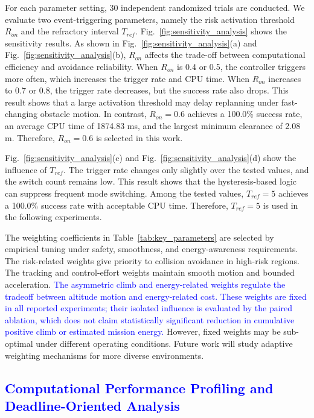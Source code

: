 \documentclass[lettersize,journal]{IEEEtran}
\begin{document}
For each parameter setting, 30 independent randomized trials are conducted. We evaluate two event-triggering parameters, namely the risk activation threshold $R_{on}$ and the refractory interval $T_{ref}$. Fig.~\ref{fig:sensitivity_analysis} shows the sensitivity results. As shown in Fig.~\ref{fig:sensitivity_analysis}(a) and Fig.~\ref{fig:sensitivity_analysis}(b), $R_{on}$ affects the trade-off between computational efficiency and avoidance reliability. When $R_{on}$ is 0.4 or 0.5, the controller triggers more often, which increases the trigger rate and CPU time. When $R_{on}$ increases to 0.7 or 0.8, the trigger rate decreases, but the success rate also drops. This result shows that a large activation threshold may delay replanning under fast-changing obstacle motion. In contrast, $R_{on}=0.6$ achieves a 100.0\% success rate, an average CPU time of 1874.83 ms, and the largest minimum clearance of 2.08 m. Therefore, $R_{on}=0.6$ is selected in this work.

Fig.~\ref{fig:sensitivity_analysis}(c) and Fig.~\ref{fig:sensitivity_analysis}(d) show the influence of $T_{ref}$. The trigger rate changes only slightly over the tested values, and the switch count remains low. This result shows that the hysteresis-based logic can suppress frequent mode switching. Among the tested values, $T_{ref}=5$ achieves a 100.0\% success rate with acceptable CPU time. Therefore, $T_{ref}=5$ is used in the following experiments.

The weighting coefficients in Table~\ref{tab:key_parameters} are selected by empirical tuning under safety, smoothness, and energy-awareness requirements. The risk-related weights give priority to collision avoidance in high-risk regions. The tracking and control-effort weights maintain smooth motion and bounded acceleration. \textcolor{blue}{The asymmetric climb and energy-related weights regulate the tradeoff between altitude motion and energy-related cost. These weights are fixed in all reported experiments; their isolated influence is evaluated by the paired ablation, which does not claim statistically significant reduction in cumulative positive climb or estimated mission energy.} However, fixed weights may be sub-optimal under different operating conditions. Future work will study adaptive weighting mechanisms for more diverse environments.

\subsection{\textcolor{blue}{Computational Performance Profiling and Deadline-Oriented Analysis}}
\end{document}
